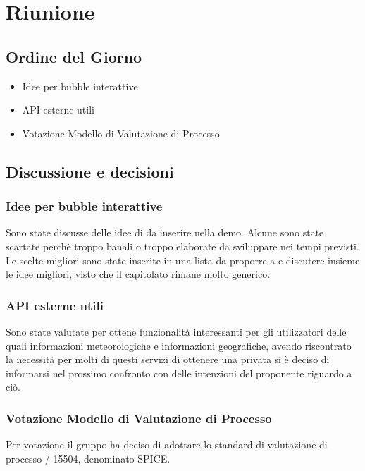 \section{Riunione}
\subsection{Ordine del Giorno}
\begin{itemize}
	\item Idee per bubble interattive
	\item API esterne utili
	\item Votazione Modello di Valutazione di Processo
\end{itemize}

\subsection{Discussione e decisioni}
\subsubsection{Idee per bubble interattive}
Sono state discusse delle idee di  da inserire nella demo. Alcune sono state scartate perchè troppo banali o troppo elaborate da sviluppare nei tempi previsti. Le scelte migliori sono state inserite in una lista da proporre a \Proponente{} e discutere insieme le idee migliori, visto che il capitolato rimane molto generico.

\subsubsection{API esterne utili}
Sono state valutate  per ottene funzionalità interessanti per gli utilizzatori delle  quali informazioni meteorologiche e informazioni geografiche, avendo riscontrato la necessità per molti di questi servizi di ottenere una  privata si è deciso di informarsi nel prossimo confronto con \Proponente{} delle intenzioni del proponente riguardo a ciò.  

\subsubsection{Votazione Modello di Valutazione di Processo}
Per votazione il gruppo \GroupName{} ha deciso di adottare lo standard di valutazione di processo / 15504, denominato SPICE.

\clearpage

